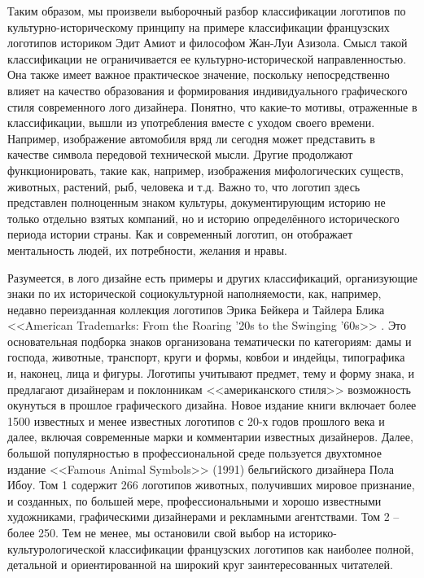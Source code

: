 Таким образом, мы произвели выборочный разбор классификации логотипов по
культурно-историческому принципу на примере классификации французских
логотипов историком Эдит Амиот и философом Жан-Луи Азизола. Смысл такой
классификации не ограничивается ее культурно\hyp{}исторической направленностью.
Она также имеет важное практическое значение, поскольку непосредственно
влияет на качество образования и формирования индивидуального графического
стиля современного лого дизайнера. Понятно, что какие-то мотивы, отраженные
в классификации, вышли из употребления вместе с уходом своего времени.
Например, изображение автомобиля вряд ли сегодня может представить в качестве
символа передовой технической мысли. Другие продолжают функционировать,
такие как, например, изображения мифологических существ, животных, растений,
рыб, человека и т.д. Важно то, что логотип здесь представлен полноценным
знаком культуры, документирующим историю не только отдельно взятых компаний,
но и историю определённого исторического периода истории страны. Как и
современный логотип, он отображает ментальность людей, их потребности,
желания и нравы.

Разумеется, в лого дизайне есть примеры и других классификаций,
организующие знаки по их исторической социокультурной наполняемости, как,
например, недавно переизданная коллекция логотипов Эрика Бейкера и Тайлера
Блика <<American Trademarks: From the Roaring '20s to the Swinging '60s>> \autocite{bakerblik2010}.
Это основательная подборка знаков организована тематически по категориям:
дамы и господа, животные, транспорт, круги и формы, ковбои и индейцы,
типографика и, наконец, лица и фигуры. Логотипы учитывают предмет, тему и
форму знака, и предлагают дизайнерам и поклонникам <<американского стиля>>
возможность окунуться в прошлое графического дизайна. Новое издание книги
включает более 1500 известных и менее известных логотипов с 20-х годов
прошлого века и далее, включая современные марки и комментарии известных
дизайнеров. Далее, большой популярностью в профессиональной среде пользуется
двухтомное издание <<Famous Animal Symbols>> (1991) бельгийского дизайнера Пола
Ибоу\autocite{ibou1991}.
Том 1 содержит 266 логотипов животных, получивших мировое признание, и
созданных, по большей мере, профессиональными и хорошо известными художниками,
графическими дизайнерами и рекламными агентствами. Том 2 -- более 250. Тем не
менее, мы остановили свой выбор на историко-культурологической классификации французских логотипов как наиболее полной, детальной и ориентированной на широкий круг
заинтересованных читателей.

